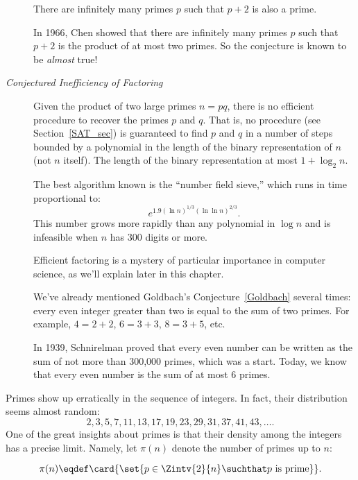 \begin{description}

\item[] There are infinitely many primes
  $p$ such that $p + 2$ is also a prime.

  In 1966, Chen showed that there are infinitely many primes $p$ such
  that $p + 2$ is the product of at most two primes.  So the
  conjecture is known to be \emph{almost} true!

\item[\emph{Conjectured Inefficiency of Factoring}] Given the
  product of two large primes $n = pq$, there is no efficient
  procedure to recover the primes $p$ and $q$.  That is, no
  \emph{} procedure (see Section~\ref{SAT_sec})
  is guaranteed to find $p$ and $q$ in a number of steps bounded by a
  polynomial in the length of the binary representation of $n$ (not
  $n$ itself).  The length of the binary representation at most
  $1+\log_2 n$.

  The best algorithm known is the ``number field sieve,'' which runs
  in time proportional to:
  \[
  e^{1.9(\ln n)^{1/3} (\ln\ln n)^{2/3}}.
  \]
  This number grows more rapidly than any polynomial in $\log n$ and
  is infeasible when $n$ has 300 digits or more.

  Efficient factoring is a mystery of particular importance in
  computer science, as we'll explain later in this chapter.

\item[\emph{}] We've already mentioned Goldbach's
  Conjecture~\ref{Goldbach} several times: every even integer greater
  than two is equal to the sum of two primes.  For example, $4 = 2 +
  2$, $6 = 3 + 3$, $8 = 3 + 5$, etc.

  In 1939, Schnirelman proved that every even number can be written as
  the sum of not more than 300,000 primes, which was a start.  Today,
  we know that every even number is the sum of at most 6 primes.
\end{description}

Primes show up erratically in the sequence of integers.  In fact,
their distribution seems almost random:
\[
2, 3, 5, 7, 11, 13, 17, 19, 23, 29, 31, 37, 41, 43, \dots.
\]
One of the great insights about primes is that their density among the
integers has a precise limit.  Namely, let $\pi(n)$ denote the number
of primes up to $n$:

\begin{definition}\label{def:prime<x}
\[
  \pi(n) \eqdef \card{\set{p \in \Zintv{2}{n} \suchthat p \text{ is
        prime}}}.
\]
\end{definition}


